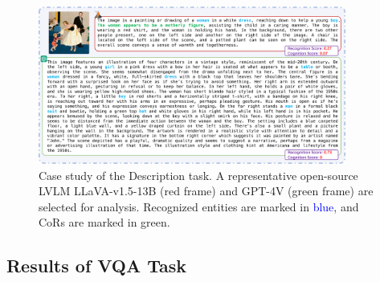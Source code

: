 \begin{figure}[th]
    \centering
    \includegraphics[width=0.9\textwidth]{figs/case_single3.pdf}
    \caption{Case study of the Description task. 
    A representative open-source LVLM LLaVA-v1.5-13B (red frame) and GPT-4V (green frame) are selected for analysis. 
    Recognized entities are marked in \textcolor{blue}{blue}, and CoRs are marked in \textcolor{c2}{green}.
    }
    \label{fig:case}
\end{figure}



\subsection{Results of VQA Task}

